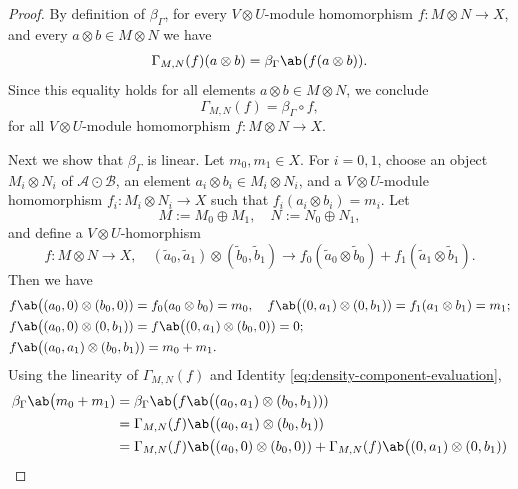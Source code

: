 \documentclass[12pt, english]{article}
\numberwithin{equation}{section}
\theoremstyle{plain}
\theoremstyle{definition}
\theoremstyle{remark}
\begin{document}
\begin{proof}
		\vspace{0.2cm}
		
		By definition of $\beta_{\Gamma}$, for every $V \otimes U$-module homomorphism $f \colon M \otimes N \to X$, and every $a \otimes b \in M \otimes N$
		we have
		\begin{align} \label{eq:density-component-evaluation}
			\Gamma_{M, N}(f) (a \otimes b) = \beta_{\Gamma} \ab\big(f (a \otimes b)).
		\end{align}
		Since this equality holds for all elements $a \otimes b \in M \otimes N$, we conclude
		\[
		\Gamma_{M, N}(f) = \beta_{\Gamma} \circ f,
		\]
		for all $V \otimes U$-module homomorphism $f \colon M \otimes N \to X$.
		
		\vspace{0.2cm}
		
		Next we show that $\beta_{\Gamma} $  is linear.
		Let $m_0, m_1 \in X$.
		For $i = 0, 1$, choose an object $M_i \otimes N_i$ of $\mathcal{A} \odot \mathcal{B}$,
		an element $a_i \otimes b_i \in M_i \otimes N_i$, and a $V \otimes U$-module homomorphism $f_i \colon M_i \otimes N_i \to X$ such that
		$f_i(a_i \otimes b_i) = m_i$.
		Let
		\[
		M := M_0 \oplus M_1, \quad N := N_0 \oplus N_1,
		\]
		and define a $V \otimes U$-homorphism
		\[
		f \colon M \otimes N \longrightarrow X, \quad (\widetilde{a}_0, \widetilde{a}_1) \otimes (\widetilde{b}_0, \widetilde{b}_1) \longrightarrow f_0(\widetilde{a}_0 \otimes \widetilde{b}_0) + f_1(\widetilde{a}_1 \otimes \widetilde{b}_1).
		\]
		Then we have
		\begin{align*}
			& f \ab\big((a_0, 0) \otimes (b_0, 0)) = f_0(a_0 \otimes b_0) = m_0,
			\quad f \ab\big((0, a_1) \otimes (0, b_1)) = f_1(a_1 \otimes b_1) = m_1; \\
			& f \ab\big((a_0, 0) \otimes (0, b_1)) = f \ab\big((0, a_1) \otimes (b_0, 0)) = 0;\\
			& f \ab\big((a_0, a_1) \otimes (b_0, b_1)) = m_0 + m_1.
		\end{align*}
		Using the linearity of $\Gamma_{M, N}(f)$ and Identity \eqref{eq:density-component-evaluation},
		\begin{align*}
			\beta_{\Gamma} \ab\big(m_0 + m_1) & = \beta_{\Gamma} \ab\big(f \ab\big((a_0, a_1) \otimes (b_0, b_1))) \\
			& = \Gamma_{M, N}(f) \ab\big((a_0, a_1) \otimes (b_0, b_1)) \\
			& = \Gamma_{M, N}(f) \ab\big((a_0, 0) \otimes (b_0, 0)) + \Gamma_{M, N}(f) \ab\big((0, a_1) \otimes (0, b_1)) \\

\end{align*}
\end{proof}
\end{document}
